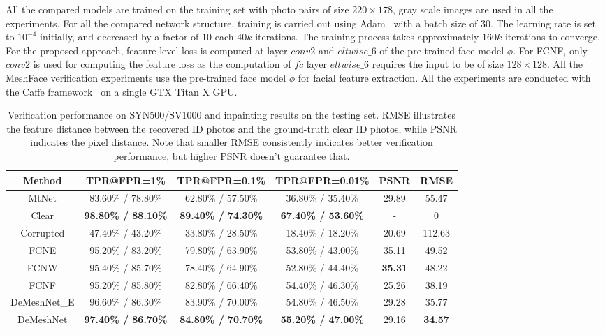 \documentclass[10pt,twocolumn,letterpaper]{article}
\begin{document}
All the compared models are trained on the training set with photo pairs of size $220 \times 178$, gray scale images are used in all the experiments. For all the compared network structure, training is carried out using Adam~\cite{adam} with a batch size of $30$. The learning rate is set to $10^{-4}$ initially, and decreased by a factor of $10$ each $40k$ iterations. The training process takes approximately $160k$ iterations to converge. For the proposed approach, feature level loss is computed at layer $conv2$ and $eltwise\_6$ of the pre-trained face model $\phi$. For FCNF, only $conv2$ is used for computing the feature loss as the computation of $fc$ layer $eltwise\_6$ requires the input to be of size $128\times 128$. All the MeshFace verification experiments use the pre-trained face model $\phi$ for facial feature extraction. All the experiments are conducted with the Caffe framework~\cite{jia2014caffe} on a single GTX Titan X GPU.




\begin{table*} %
\centering  %
\caption{Verification performance on SYN500/SV1000 and inpainting results on the testing set. RMSE illustrates the feature distance between the recovered ID photos and the ground-truth clear ID photos, while PSNR indicates the pixel distance. Note that smaller RMSE consistently indicates better verification performance, but higher PSNR doesn't guarantee that.}  %
 \begin{tabular}{|c|c|c|c|c|c|}  %

     \hline
       Method&TPR@FPR=1\% &  TPR@FPR=0.1\% & TPR@FPR=0.01\%&PSNR&RMSE  \\
       \hline
            \hline
       MtNet &83.60\% / 78.80\% & 62.80\% / 57.50\%&36.80\% / 35.40\% &29.89& 55.47    \\
       Clear & \bf{98.80\%} / 88.10\%& \bf{89.40\%} / 74.30\%&\bf{67.40\% / 53.60\%}&-&0\\
       Corrupted & 47.40\% / 43.20\% & 33.80\% / 28.50\%&18.40\% / 18.20\%&20.69&112.63\\
       \hline
       FCNE & 95.20\% / 83.20\% & 79.80\% / 63.90\%&53.80\% / 43.00\% & 35.11&49.52\\
       FCNW & 95.40\% / 85.70\% & 78.40\% / 64.90\%  & 52.80\% / 44.40\%&\bf{35.31}&48.22\\
        FCNF & 95.20\% / 85.80\% & 82.80\% / 66.40\% &54.40\% / 46.30\% &  25.26& 38.19  \\
        DeMeshNet\_E & 96.60\% / 86.30\% & 83.90\% / 70.00\% &54.80\% / 46.50\% &  29.28& 35.77  \\
        \hline
        DeMeshNet & \bf{97.40\%} / 86.70\% & \bf{84.80\%} / 70.70\%&\bf{55.20}\% / 47.00\%&29.16&\bf{34.57} \\
       \hline

   \end{tabular}\label{tab:psnr}
\end{table*}
\end{document}
